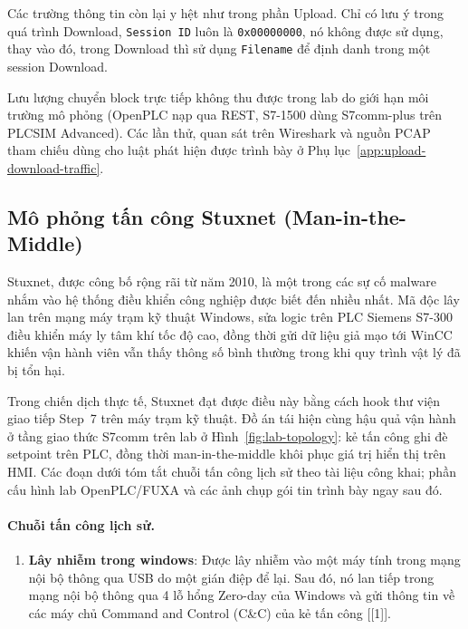 \documentclass[../main.tex]{subfiles}
\begin{document}
Các trường thông tin còn lại y hệt như trong phần Upload. Chỉ có lưu ý trong quá trình Download, \texttt{Session ID} luôn là \texttt{0x00000000}, nó không được sử dụng, thay vào đó, trong Download thì sử dụng \texttt{Filename} để định danh trong một session Download.

Lưu lượng chuyển block trực tiếp không thu được trong lab do giới hạn môi trường mô phỏng (OpenPLC nạp qua REST, S7-1500 dùng S7comm-plus trên PLCSIM Advanced). Các lần thử, quan sát trên Wireshark và nguồn PCAP tham chiếu dùng cho luật phát hiện được trình bày ở Phụ lục~\ref{app:upload-download-traffic}.

\subsection{Mô phỏng tấn công Stuxnet (Man-in-the-Middle)}
\label{sec:stuxnet_mitm_sim}

Stuxnet, được công bố rộng rãi từ năm 2010, là một trong các sự cố malware nhắm vào hệ thống điều khiển công nghiệp được biết đến nhiều nhất. Mã độc lây lan trên mạng máy trạm kỹ thuật Windows, sửa logic trên PLC Siemens S7-300 điều khiển máy ly tâm khí tốc độ cao, đồng thời gửi dữ liệu giả mạo tới WinCC khiến vận hành viên vẫn thấy thông số bình thường trong khi quy trình vật lý đã bị tổn hại.

Trong chiến dịch thực tế, Stuxnet đạt được điều này bằng cách hook thư viện giao tiếp Step~7 trên máy trạm kỹ thuật. Đồ án tái hiện cùng hậu quả vận hành ở tầng giao thức S7comm trên lab ở Hình~\ref{fig:lab-topology}: kẻ tấn công ghi đè setpoint trên PLC, đồng thời man-in-the-middle khôi phục giá trị hiển thị trên HMI. Các đoạn dưới tóm tắt chuỗi tấn công lịch sử theo tài liệu công khai; phần cấu hình lab OpenPLC/FUXA và các ảnh chụp gói tin trình bày ngay sau đó.

\paragraph{Chuỗi tấn công lịch sử.}

\begin{enumerate}
    \item \textbf{Lây nhiễm trong windows}: Được lây nhiễm vào một máy tính trong mạng nội bộ thông qua USB do một gián điệp để lại. Sau đó, nó lan tiếp trong mạng nội bộ thông qua 4 lỗ hổng Zero-day  của Windows và gửi thông tin về các máy chủ Command and Control (C\&C) của kẻ tấn công [[1]].
\end{enumerate}
\end{document}
